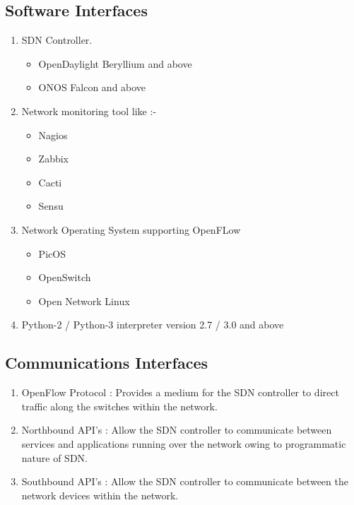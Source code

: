 \documentclass[12pt,a4paper,final]{report}
\begin{document}
\subsection{Software Interfaces}
\begin{enumerate}
\item SDN Controller.
\begin{itemize}
\item
OpenDaylight Beryllium and above

\item
ONOS Falcon and above
\end{itemize}

\item Network monitoring tool like :-
\begin{itemize}
\item
Nagios

\item
Zabbix

\item
Cacti

\item
Sensu
\end{itemize}

\item Network Operating System supporting OpenFLow
\begin{itemize}
\item
PicOS

\item
OpenSwitch

\item
Open Network Linux
\end{itemize}

\item
Python-2 / Python-3 interpreter version 2.7 / 3.0 and above
\end{enumerate}

\subsection{Communications Interfaces}
\begin{enumerate}
\item OpenFlow Protocol :
\newline
Provides a medium for the SDN controller to direct traffic along the switches within the network.

\item Northbound API's :
\newline
Allow the SDN controller to communicate between services and applications running over the network owing to programmatic nature of SDN.

\item Southbound API's :
\newline
Allow the SDN controller to communicate between the network devices within the network.
\end{enumerate}
\end{document}
